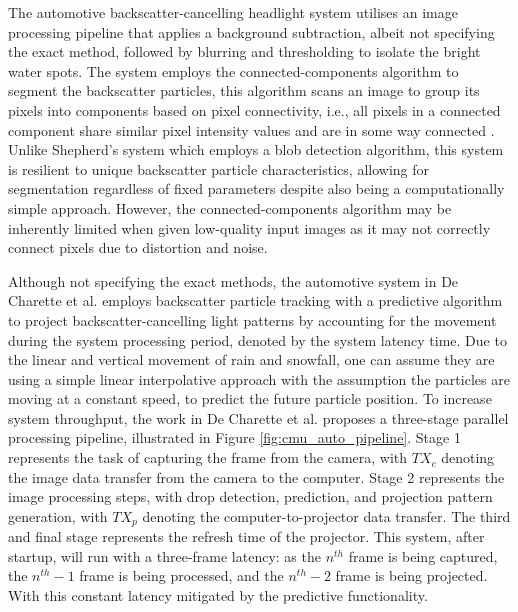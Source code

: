 The automotive backscatter-cancelling headlight system utilises an image processing pipeline that applies a background subtraction, albeit not specifying the exact method, followed by blurring and thresholding to isolate the bright water spots. The system employs the connected-components algorithm to segment the backscatter particles, this algorithm scans an image to group its pixels into components based on pixel connectivity, i.e., all pixels in a connected component share similar pixel intensity values and are in some way connected \cite{robertfisherConnectedComponentsLabeling2003}. Unlike Shepherd's system which employs a blob detection algorithm, this system is resilient to unique backscatter particle characteristics, allowing for segmentation regardless of fixed parameters despite also being a computationally simple approach. However, the connected-components algorithm may be inherently limited when given low-quality input images as it may not correctly connect pixels due to distortion and noise.

Although not specifying the exact methods, the automotive system in De Charette et al. employs backscatter particle tracking with a predictive algorithm to project backscatter-cancelling light patterns by accounting for the movement during the system processing period, denoted by the system latency time. Due to the linear and vertical movement of rain and snowfall, one can assume they are using a simple linear interpolative approach with the assumption the particles are moving at a constant speed, to predict the future particle position. To increase system throughput, the work in De Charette et al. proposes a three-stage parallel processing pipeline, illustrated in Figure \ref{fig:cmu_auto_pipeline}. Stage 1 represents the task of capturing the frame from the camera, with $TX_c$ denoting the image data transfer from the camera to the computer. Stage 2 represents the image processing steps, with drop detection, prediction, and projection pattern generation, with $TX_p$ denoting the computer-to-projector data transfer. The third and final stage represents the refresh time of the projector. This system, after startup, will run with a three-frame latency: as the $n^{th}$ frame is being captured, the $n^{th} - 1$ frame is being processed, and the $n^{th} - 2$ frame is being projected. With this constant latency mitigated by the predictive functionality.

